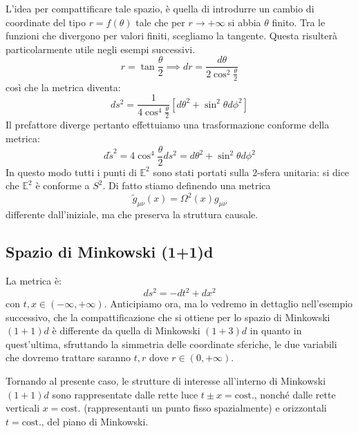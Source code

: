 L'idea per compattificare tale spazio, è quella di introdurre un cambio di coordinate del tipo $r= f(\theta)$ tale che per $r\rightarrow + \infty$ si abbia $\theta$ finito. Tra le funzioni che divergono per valori finiti, scegliamo la tangente. Questa risulterà particolarmente utile negli esempi successivi.
\begin{equation*}
    r = \tan\frac{\theta}{2} \implies dr= \frac{d\theta}{2\cos^2\frac{\theta}{2}}
\end{equation*}
così che la metrica diventa:
\begin{equation*}
    ds^2 =\frac{1}{4\cos^4\frac{\theta}{2}}[ d\theta^2 + \sin^2\theta d\phi^2]
\end{equation*}
Il prefattore diverge pertanto effettuiamo una trasformazione conforme della metrica:
\begin{equation*}
    d\tilde{s}^2 = 4\cos^4\frac{\theta}{2} ds^2 = d\theta^2 + \sin^2\theta d\phi^2
\end{equation*}
In questo modo tutti i punti di $\mathbb{E}^2$ sono stati portati sulla 2-sfera unitaria: si dice che $\mathbb{E}^2$ è conforme a $S^2$. Di fatto stiamo definendo una metrica
\begin{equation*}
    \tilde{g}_{\mu\nu}(x) = \Omega^2(x)g_{\mu\nu}
\end{equation*}
differente dall'iniziale, ma che preserva la struttura causale. 
\subsection{Spazio di Minkowski (1+1)d}
La metrica è:
\begin{equation*}
    ds^2 = -dt^2 + dx^2
\end{equation*}
con $t, x \in (-\infty,+\infty)$. Anticipiamo ora, ma lo vedremo in dettaglio nell'esempio successivo, che la compattificazione che si ottiene per lo spazio di Minkowski $(1+1)d$ è differente da quella di Minkowski $(1+3)d$ in quanto in quest'ultima, sfruttando la simmetria delle coordinate sferiche, le due variabili che dovremo trattare saranno $t, r$ dove $r \in (0,+\infty)$.

Tornando al presente caso, le strutture di interesse all'interno di Minkowski $(1+1)d$ sono rappresentate dalle rette luce $t\pm x = \textrm{cost.}$, nonché dalle rette verticali $x = \textrm{cost.}$ (rappresentanti un punto fisso spazialmente) e orizzontali $t = \textrm{cost.}$, del piano di Minkowski.

